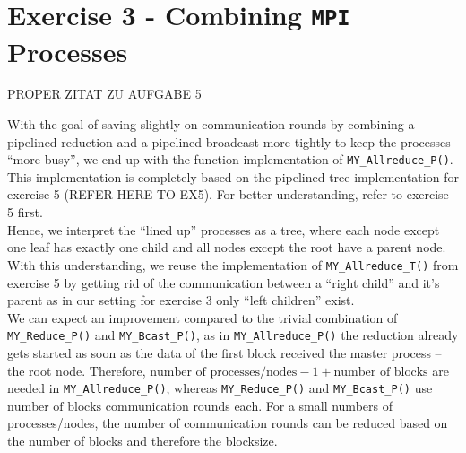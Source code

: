 \section{Exercise 3 - Combining \texttt{MPI} Processes}

PROPER ZITAT ZU AUFGABE 5

With the goal of saving slightly on communication rounds by combining a pipelined reduction and a 
pipelined broadcast more tightly to keep the processes “more busy”, we end up with the function implementation 
of \texttt{MY\_Allreduce\_P()}. This implementation is completely based on the pipelined tree 
implementation for exercise 5 (REFER HERE TO EX5). For better understanding, refer to exercise 5 first.\\

Hence, we interpret the “lined up” processes as a tree, where each node except one leaf has exactly 
one child and all nodes except the root have a parent node. With this understanding, we reuse the 
implementation of \texttt{MY\_Allreduce\_T()} from exercise 5 by getting rid of the communication between 
a “right child” and it’s parent as in our setting for exercise 3 only “left children” exist.\\

We can expect an improvement compared to the trivial combination of \texttt{MY\_Reduce\_P()} and 
\texttt{MY\_Bcast\_P()}, as in \texttt{MY\_Allreduce\_P()} the reduction already gets started as soon 
as the data of the first block received the master process -- the root node. Therefore, 
$\text{number of processes/nodes} - 1 + \text{number of blocks}$ are needed in \texttt{MY\_Allreduce\_P()}, 
whereas \texttt{MY\_Reduce\_P()} and \texttt{MY\_Bcast\_P()} use $\text{number of blocks}$ communication rounds 
each. For a small numbers of processes/nodes, the number of communication rounds can be reduced based 
on the number of blocks and therefore the blocksize.\\